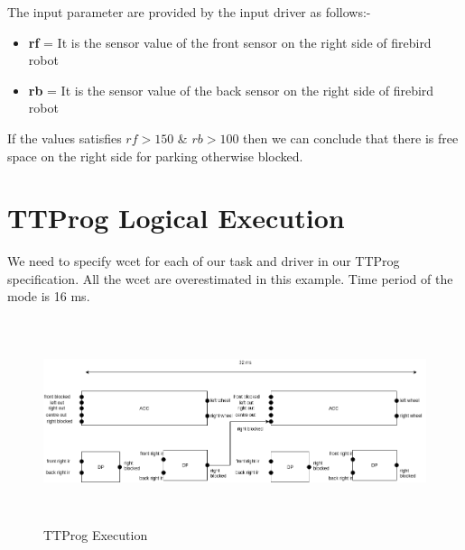 \documentclass[16pt]{report}
\begin{document}
The input parameter are provided by the input driver as follows:-
\begin{itemize}
    \item \textbf{rf} = It is the sensor value of the front sensor on the right side of firebird robot
    \item \textbf{rb} = It is the sensor value of the back sensor on the right side of firebird robot
\end{itemize}
If the values satisfies $rf > 150$ \& $rb > 100$ then we can conclude that there is free space on the right side for parking otherwise blocked.

\section{TTProg Logical Execution}
We need to specify wcet for each of our task and driver in our TTProg specification. All the wcet are overestimated in this example. Time period of the mode is 16 ms.

\begin{figure}[H]
\centering
\includegraphics[width=\linewidth , height= 6cm]{22ttprogExp.png}
\caption{TTProg Execution}
\end{figure}
\end{document}
